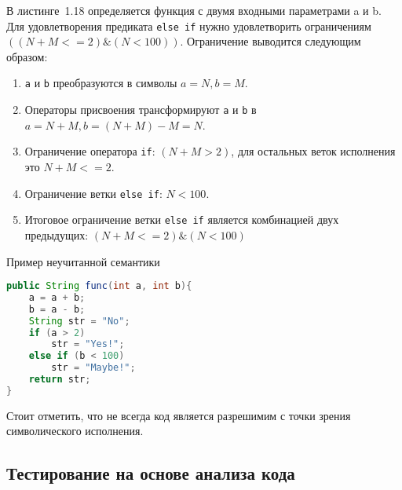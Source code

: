 В листинге~1.18 определяется функция с двумя входными параметрами a и b. Для удовлетворения предиката \texttt{else if} нужно удовлетворить ограничениям \(((N + M <= 2)\&(N < 100))\). Ограничение выводится следующим образом:

\begin{enumerate}
	\item \texttt{a} и \texttt{b} преобразуются в символы  \(a = N, b = M\).
	\item Операторы присвоения трансформируют \texttt{a} и \texttt{b} в  \(a = N + M, b = (N + M) - M = N\).
	\item Ограничение оператора \texttt{if}: \((N + M > 2)\), для остальных веток исполнения это \(N + M <= 2\).
	\item Ограничение ветки \texttt{else if}: \(N < 100\).
	\item Итоговое ограничение ветки \texttt{else if} является комбинацией  двух предыдущих:  \( (N + M <= 2) \& (N < 100)\)
\end{enumerate}

\begin{ListingEnv}[!h]%
	\captiondelim{ } %
	\caption{Пример неучитанной семантики}
	\begin{lstlisting}[language={Java}]
public String func(int a, int b){
	a = a + b;
	b = a - b;
	String str = "No";
	if (a > 2)
		str = "Yes!";
	else if (b < 100)
		str = "Maybe!";
	return str;
}
	\end{lstlisting}
\end{ListingEnv}%

Стоит отметить, что не всегда код является разрешимим с точки зрения символического исполнения.


\subsection{Тестирование на основе анализа кода} 
 
 
